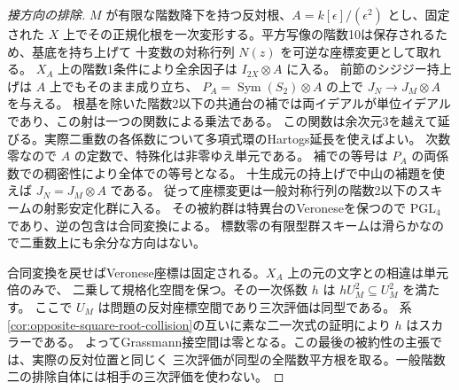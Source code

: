 \begin{proof}[接方向の排除]
$M$ が有限な階数降下を持つ反対根、$A=k[\epsilon]/(\epsilon^2)$ とし、固定された
$X$ 上でその正規化根を一次変形する。平方写像の階数10は保存されるため、基底を持ち上げて
十変数の対称行列 $N(z)$ を可逆な座標変更として取れる。
$X_A$ 上の階数1条件により全余因子は $I_{2X}\otimes A$ に入る。
前節のシジジー持上げは $A$ 上でもそのまま成り立ち、
$P_A=\operatorname{Sym}(S_2)\otimes A$ の上で $J_N\to J_M\otimes A$ を与える。
根基を除いた階数2以下の共通台の補では両イデアルが単位イデアルであり、この射は一つの関数による乗法である。
この関数は余次元3を越えて延びる。実際二重数の各係数について多項式環のHartogs延長を使えばよい。
次数零なので $A$ の定数で、特殊化は非零ゆえ単元である。
補での等号は $P_A$ の両係数での稠密性により全体での等号となる。
十生成元の持上げで中山の補題を使えば $J_N=J_M\otimes A$ である。
従って座標変更は一般対称行列の階数2以下のスキームの射影安定化群に入る。
その被約群は特異台のVeroneseを保つので $\mathrm{PGL}_4$ であり、逆の包含は合同変換による。
標数零の有限型群スキームは滑らかなので二重数上にも余分な方向はない。

合同変換を戻せばVeronese座標は固定される。$X_A$ 上の元の文字との相違は単元倍のみで、
二乗して規格化空間を保つ。その一次係数 $h$ は $hU_M^2\subseteq U_M^2$ を満たす。
ここで $U_M$ は問題の反対座標空間であり三次評価は同型である。
系\ref{cor:opposite-square-root-collision}の互いに素な二一次式の証明により $h$ はスカラーである。
よってGrassmann接空間は零となる。この最後の被約性の主張では、実際の反対位置と同じく
三次評価が同型の全階数平方根を取る。一般階数二の排除自体には相手の三次評価を使わない。
\end{proof}
